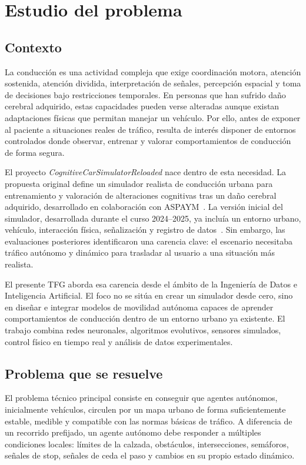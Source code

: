 \chapter{Estudio del problema}

\section{Contexto}

La conducción es una actividad compleja que exige coordinación motora, atención sostenida, atención dividida, interpretación de señales, percepción espacial y toma de decisiones bajo restricciones temporales. En personas que han sufrido daño cerebral adquirido, estas capacidades pueden verse alteradas aunque existan adaptaciones físicas que permitan manejar un vehículo. Por ello, antes de exponer al paciente a situaciones reales de tráfico, resulta de interés disponer de entornos controlados donde observar, entrenar y valorar comportamientos de conducción de forma segura.

El proyecto \textit{CognitiveCarSimulatorReloaded} nace dentro de esta necesidad. La propuesta original define un simulador realista de conducción urbana para entrenamiento y valoración de alteraciones cognitivas tras un daño cerebral adquirido, desarrollado en colaboración con ASPAYM~\cite{propuesta}. La versión inicial del simulador, desarrollada durante el curso 2024--2025, ya incluía un entorno urbano, vehículo, interacción física, señalización y registro de datos~\cite{cognitivecar2025}. Sin embargo, las evaluaciones posteriores identificaron una carencia clave: el escenario necesitaba tráfico autónomo y dinámico para trasladar al usuario a una situación más realista.

El presente TFG aborda esa carencia desde el ámbito de la Ingeniería de Datos e Inteligencia Artificial. El foco no se sitúa en crear un simulador desde cero, sino en diseñar e integrar modelos de movilidad autónoma capaces de aprender comportamientos de conducción dentro de un entorno urbano ya existente. El trabajo combina redes neuronales, algoritmos evolutivos, sensores simulados, control físico en tiempo real y análisis de datos experimentales.

\section{Problema que se resuelve}

El problema técnico principal consiste en conseguir que agentes autónomos, inicialmente vehículos, circulen por un mapa urbano de forma suficientemente estable, medible y compatible con las normas básicas de tráfico. A diferencia de un recorrido prefijado, un agente autónomo debe responder a múltiples condiciones locales: límites de la calzada, obstáculos, intersecciones, semáforos, señales de stop, señales de ceda el paso y cambios en su propio estado dinámico.

